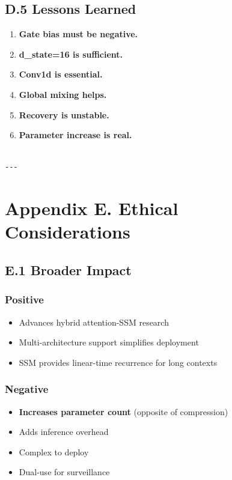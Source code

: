 \subsection{D.5 Lessons Learned}

\begin{enumerate}
\item \textbf{Gate bias must be negative.}
\item \textbf{d\_state=16 is sufficient.}
\item \textbf{Conv1d is essential.}
\item \textbf{Global mixing helps.}
\item \textbf{Recovery is unstable.}
\item \textbf{Parameter increase is real.}
\end{enumerate}
\begin{lstlisting}

---
\end{lstlisting}


\section{Appendix E. Ethical Considerations}

\subsection{E.1 Broader Impact}

\subsubsection{Positive}
\begin{itemize}
\item Advances hybrid attention-SSM research
\item Multi-architecture support simplifies deployment
\item SSM provides linear-time recurrence for long contexts

\end{itemize}
\subsubsection{Negative}
\begin{itemize}
\item \textbf{Increases parameter count} (opposite of compression)
\item Adds inference overhead
\item Complex to deploy
\item Dual-use for surveillance

\end{itemize}

